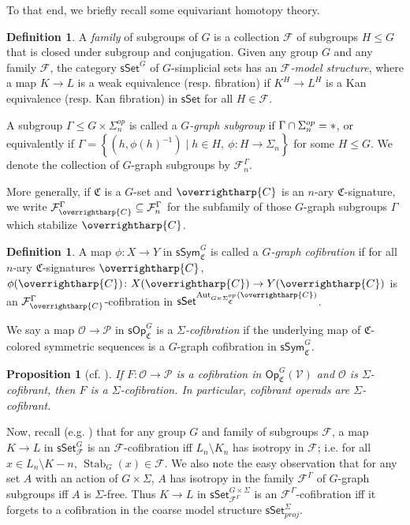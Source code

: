 \documentclass[a4paper,10pt
,draft
]{article}%
\numberwithin{equation}{section}
\numberwithin{figure}{section}
\newtheorem{proposition}[equation]{Proposition}%
\theoremstyle{definition} %
\newtheorem{definition}[equation]{Definition}%
\newcommand{\sets}[2]{\left\{ #1 \;|\; #2\right\}}%
\newcommand{\vect}[1]{\text{\overrightharp{\ensuremath{#1}}}}
\newcommand{\sSet}{\ensuremath{\mathsf{sSet}}}%
\newcommand{\Op}{\mathsf{Op}}%
\newcommand{\sOp}{\ensuremath{\mathsf{sOp}}}%
\newcommand{\sSym}{\ensuremath{\mathsf{sSym}}}%
\DeclareMathOperator{\Aut}{Aut}%
\DeclareMathOperator{\Stab}{Stab}
\newcommand{\F}{\ensuremath{\mathcal F}}
\newcommand{\V}{\ensuremath{\mathcal V}}
\renewcommand{\O}{\ensuremath{\mathcal O}}
\renewcommand{\P}{\ensuremath{\mathcal P}}
\newcommand{\1}{\ensuremath{\mathbbm 1}}%
\begin{document}
To that end, we briefly recall some equivariant homotopy theory.
\begin{definition}
      A \textit{family} of subgroups of $G$ is a collection $\F$ of subgroups $H \leq G$ that is closed under subgroup and conjugation.
      Given any group $G$ and any family $\F$, the category $\sSet^G$ of $G$-simplicial sets has an \textit{$\F$-model structure},
      where a map $K \to L$ is a weak equivalence (resp. fibration) if
      $K^H \to L^H$ is a Kan equivalence (resp. Kan fibration) in $\sSet$ for all $H \in \F$.
\end{definition}

A subgroup $ \Gamma \leq G \times \Sigma_n^{op}$ is called a \textit{$G$-graph subgroup} if $\Gamma \cap \Sigma_n^{op} = \**$,
or equivalently if $\Gamma = \sets{(h,\phi(h)^{-1})}{h \in H,\ \phi \colon H \to \Sigma_n}$ for some $H \leq G$.
We denote the collection of $G$-graph subgroups by $\F^\Gamma_n$.

More generally, if $\mathfrak C$ is a $G$-set and $\vect C$ is an $n$-ary $\mathfrak C$-signature,
we write $\F^\Gamma_{\vect C} \subseteq \F^\Gamma_n$ for the subfamily of those $G$-graph subgroups $\Gamma$ which stabilize $\vect C$.

\begin{definition}
      A map $\phi \colon X \to Y$ in $\sSym^G_{\mathfrak C}$ is called a \textit{$G$-graph cofibration} if
      for all $n$-ary $\mathfrak C$-signatures $\vect C$,
      $\phi(\vect C) \colon X(\vect C) \to Y(\vect C)$ is an $\F^\Gamma_{\vect C}$-cofibration in $\sSet^{\Aut_{G \ltimes \Sigma_{\mathfrak C}^{op}}(\vect C)}$.
      
      We say a map $\O \to \P$ in $\sOp^G_{\mathfrak C}$ is a \textit{$\Sigma$-cofibration}
      if the underlying map of $\mathfrak C$-colored symmetric sequences is a $G$-graph cofibration in $\sSym_{\mathfrak C}^G$. 
\end{definition}

\begin{proposition}[{cf. \cite[Prop. 3.63]{BP_HGOP}}]
      \label{SIGMAG_COF PROP}
      If $F \colon \O \to \P$ is a cofibration in $\Op^G_{\mathfrak C}(\V)$ and $\O$ is $\Sigma$-cofibrant,
      then $F$ is a $\Sigma$-cofibration.
      In particular, cofibrant operads are $\Sigma$-cofibrant.
\end{proposition}

Now, recall (e.g. \cite[Prop. 2.16]{Ste16}) that for any group $G$ and family of subgroups $\F$,
a map $K \to L$ in $\sSet^{G}_\F$ is an $\F$-cofibration iff $L_n \setminus K_n$ has isotropy in $\F$; i.e. for all $x \in L_n \setminus K-n$, $\Stab_{G}(x) \in \F$. 
% 
We also note the easy observation that for any set $A$ with an action of $G \times \Sigma$,
$A$ has isotropy in the family $\F^\Gamma$ of $G$-graph subgroups
iff
$A$ is $\Sigma$-free.
% 
Thus $K \to L$ in $\sSet^{G \times \Sigma}_{\F^\Gamma}$ is an $\F^\Gamma$-cofibration
iff
it forgets to a cofibration in the coarse model structure $\sSet^\Sigma_{proj}$.
\end{document}
